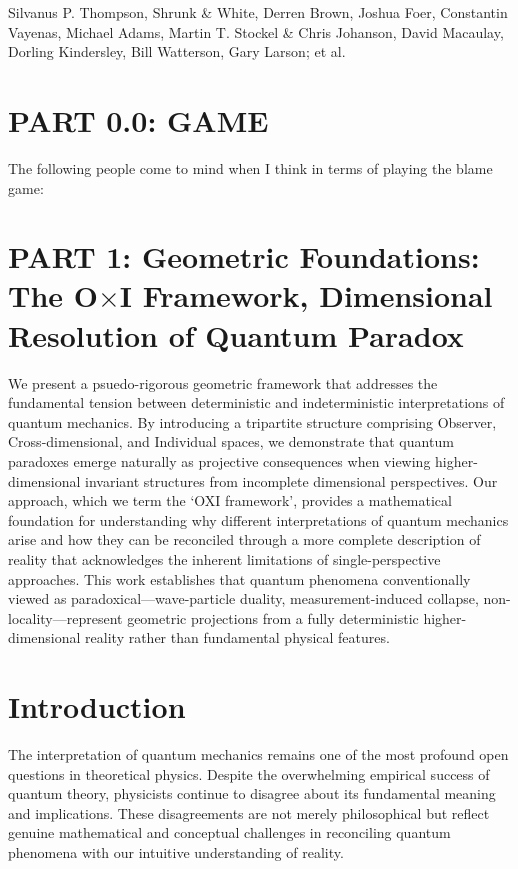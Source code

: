 \documentclass{article}
\begin{document}
Silvanus P. Thompson, Shrunk \& White, Derren Brown, Joshua Foer, Constantin Vayenas, Michael Adams, Martin T. Stockel \& Chris Johanson, David Macaulay, Dorling Kindersley, Bill Watterson, Gary Larson; et al.

\section*{PART 0.0: GAME}

The following people come to mind when I think in terms of playing the blame game:\\



\section{PART 1: Geometric Foundations: \\ The O$\times$I Framework, Dimensional Resolution of Quantum Paradox}
We present a psuedo-rigorous geometric framework that addresses the fundamental tension between deterministic and indeterministic interpretations of quantum mechanics. By introducing a tripartite structure comprising Observer, Cross-dimensional, and Individual spaces, we demonstrate that quantum paradoxes emerge naturally as projective consequences when viewing higher-dimensional invariant structures from incomplete dimensional perspectives. Our approach, which we term the `OXI framework', provides a mathematical foundation for understanding why different interpretations of quantum mechanics arise and how they can be reconciled through a more complete description of reality that acknowledges the inherent limitations of single-perspective approaches. This work establishes that quantum phenomena conventionally viewed as paradoxical—wave-particle duality, measurement-induced collapse, non-locality—represent geometric projections from a fully deterministic higher-dimensional reality rather than fundamental physical features.

\section*{Introduction}

The interpretation of quantum mechanics remains one of the most profound open questions in theoretical physics. Despite the overwhelming empirical success of quantum theory, physicists continue to disagree about its fundamental meaning and implications. These disagreements are not merely philosophical but reflect genuine mathematical and conceptual challenges in reconciling quantum phenomena with our intuitive understanding of reality.
\end{document}

